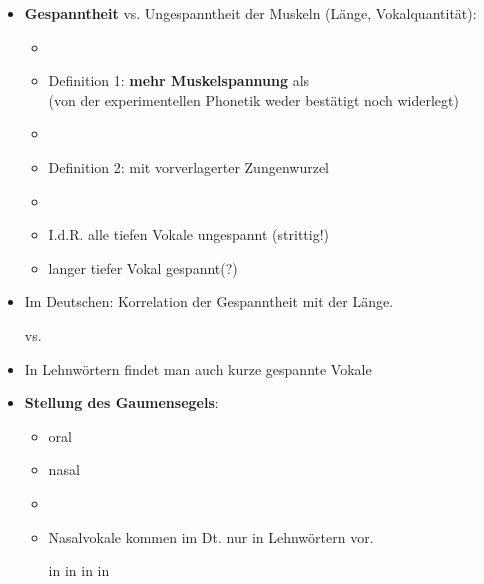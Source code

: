 \begin{frame}

	\begin{itemize}
		\item \textbf{Gespanntheit} vs. Ungespanntheit der Muskeln (Länge, Vokalquantität):
		
		\begin{itemize}
			\item[]
			\item Definition 1: \textipa{[ i:, y:, u:, o: ]} \textbf{mehr Muskelspannung} als \textipa{[ I, Y, U , O ]}\\
			(von der experimentellen Phonetik weder bestätigt noch widerlegt)
			\item[]
			\item Definition 2: mit vorverlagerter Zungenwurzel
			\item[]
			\item I.\;d.\;R. alle tiefen Vokale \ras ungespannt (strittig!)
			\item langer tiefer Vokal \textipa{[ a: ]} \ras gespannt(?)
		\end{itemize}
		
	\end{itemize}
	
\end{frame}



\begin{frame}

	\begin{itemize}
	
		\item Im Deutschen: Korrelation der Gespanntheit mit der Länge.

		\ea \textipa{[ m i: t @ ]} vs. \textipa{[ m I t @ ]}
		\z

		\item In Lehnwörtern findet man auch kurze gespannte Vokale

		\ea \textipa{[ P i . d e: ]}
		\z
		
		
		\item \textbf{Stellung des Gaumensegels}:
		
		\begin{itemize}
			\item oral
			\item nasal
			\item[]
			\item Nasalvokale kommen im Dt. nur in Lehnwörtern vor.

			\eal
			\ex \textipa{[ \~a ]} in 
			\ex \textipa{[ \~E ]} in 
			\ex \textipa{[ \~a ]} in 
			\ex \textipa{[ \~\oe\ ]} in 
			\zl
		
		\end{itemize}
		
	\end{itemize}
	
\end{frame}


